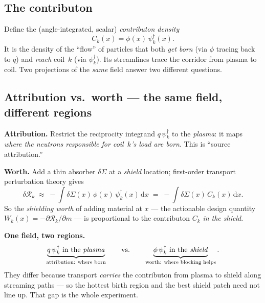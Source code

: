\documentclass[11pt]{article}
\newcommand{\psid}{\psi^{\dagger}}
\newcommand{\dd}{\,\mathrm{d}}
\newcommand{\R}{\mathcal{R}}
\begin{document}
\subsection{The contributon}
Define the (angle-integrated, scalar) \emph{contributon density}
\begin{equation}
C_k(x) = \phi(x)\,\psid_k(x).
\end{equation}
It is the density of the ``flow'' of particles that both \emph{get born} (via $\phi$ tracing back
to $q$) and \emph{reach} coil~$k$ (via $\psid_k$). Its streamlines trace the corridor from plasma
to coil. Two projections of the \emph{same} field answer two different questions.

\subsection{Attribution vs.\ worth --- the same field, different regions}
\textbf{Attribution.} Restrict the reciprocity integrand $q\,\psid_k$ to the \emph{plasma}: it maps
\emph{where the neutrons responsible for coil~$k$'s load are born}. This is ``source attribution.''

\textbf{Worth.} Add a thin absorber $\delta\Sigma$ at a \emph{shield} location; first-order transport
perturbation theory gives
\begin{equation}
\delta\R_k \;\approx\; -\!\int \delta\Sigma(x)\,\phi(x)\,\psid_k(x)\dd x
 \;=\; -\!\int \delta\Sigma(x)\,C_k(x)\dd x .
\label{eq:worth}
\end{equation}
So the \emph{shielding worth} of adding material at $x$ --- the actionable design quantity
$W_k(x)=-\partial\R_k/\partial m$ --- is proportional to the contributon $C_k$ \emph{in the
shield}.

\begin{key}
\textbf{One field, two regions.}
\[
\underbrace{q\,\psid_k \text{ in the \emph{plasma}}}_{\text{attribution: where born}}
\qquad\text{vs.}\qquad
\underbrace{\phi\,\psid_k \text{ in the \emph{shield}}}_{\text{worth: where blocking helps}}.
\]
They differ because transport \emph{carries} the contributon from plasma to shield along
streaming paths --- so the hottest birth region and the best shield patch need not line up. That
gap is the whole experiment.
\end{key}
\end{document}
